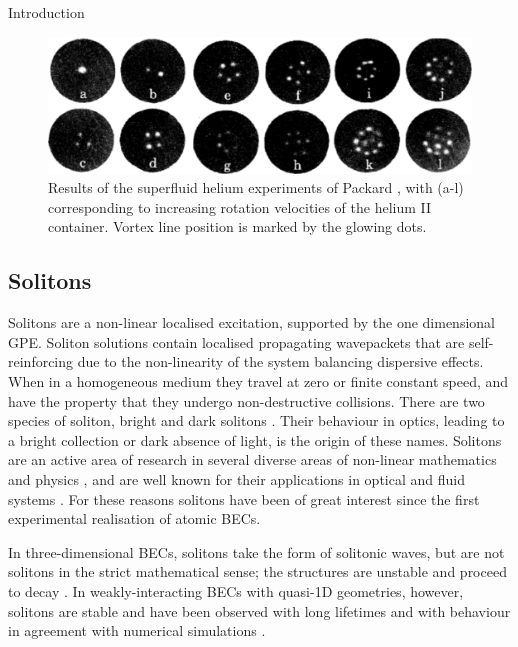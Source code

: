 \begin{chapter}{\label{cha:bose_gases}Introduction}
\begin{figure}
\includegraphics[width=\linewidth]{intro/packard}
\caption{\label{fig:hevorts} Results of the superfluid helium experiments of Packard \cite{PhysRevLett.43.214}, with (a-l) corresponding to increasing rotation velocities of the helium II container. Vortex line position is marked by the glowing dots.}
\end{figure}

\subsection{Solitons}
Solitons are a non-linear localised excitation, supported by the one dimensional GPE. Soliton solutions contain localised propagating wavepackets that are self-reinforcing due to the non-linearity of the system balancing dispersive effects. When in a homogeneous medium they travel at zero or finite constant speed, and have the property that they undergo non-destructive collisions. There are two species of soliton, bright \cite{PhysRevA.62.063611} and dark solitons \cite{PhysRevA.62.063610}. Their behaviour in optics, leading to a bright collection or dark absence of light, is the origin of these names. Solitons are an active area of research in several diverse areas of non-linear mathematics and physics \cite{drazin1989solitons,remoissenet2013waves}, and are well known for their applications in optical and fluid systems \cite{yu_kivshar_1998}. For these reasons solitons have been of great interest \cite{kevrekidis2007emergent,1751-8121-43-21-213001} since the first experimental realisation of atomic BECs.

In three-dimensional BECs, solitons take the form of solitonic waves, but are not solitons in the strict mathematical sense; the structures are unstable and proceed to decay \cite{Burger99,PhysRevA.62.053606,PhysRevA.65.043612,Tikhonenko96}. In weakly-interacting BECs with quasi-1D geometries, however, solitons are stable and have been observed with long lifetimes and with behaviour in agreement with numerical simulations \cite{PhysRevLett.101.120406}.


\end{chapter}

